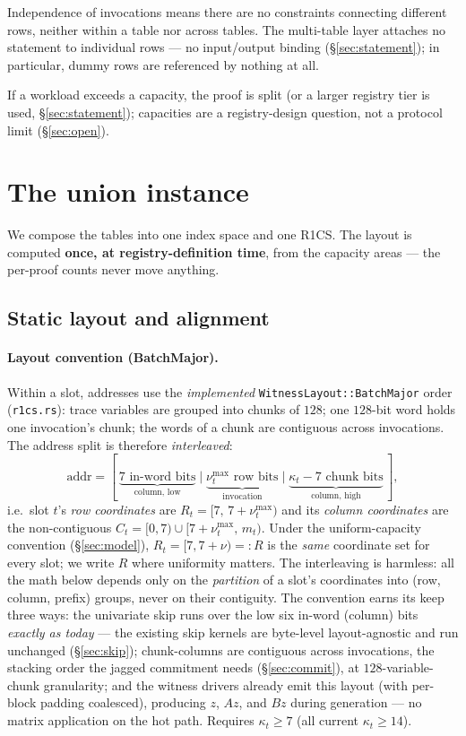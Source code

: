 \documentclass[11pt]{article}
\newcommand{\code}[1]{\texttt{#1}}
\theoremstyle{definition}
\begin{document}
Independence of invocations means there are no constraints connecting
different rows, neither within a table nor across tables. The multi-table
layer attaches no statement to individual rows --- no input/output binding
(\S\ref{sec:statement}); in particular, dummy rows are referenced by
nothing at all.

If a workload exceeds a capacity, the proof is split (or a larger registry
tier is used, \S\ref{sec:statement}); capacities are a registry-design
question, not a protocol limit (\S\ref{sec:open}).

\section{The union instance}\label{sec:union}

We compose the tables into one index space and one R1CS. The layout is
computed \textbf{once, at registry-definition time}, from the capacity
areas --- the per-proof counts never move anything.

\subsection{Static layout and alignment}

\paragraph{Layout convention (BatchMajor).} Within a slot, addresses use
the \emph{implemented} \code{WitnessLayout::BatchMajor} order
(\code{r1cs.rs}): trace variables are grouped into chunks of $128$; one
$128$-bit word holds one invocation's chunk; the words of a chunk are
contiguous across invocations. The address split is therefore
\emph{interleaved}:
\[
  \text{addr} = [\,\underbrace{7 \text{ in-word bits}}_{\text{column,
  low}} \mid \underbrace{\nu_t^{\max} \text{ row bits}}_{\text{invocation}}
  \mid \underbrace{\kappa_t - 7 \text{ chunk bits}}_{\text{column,
  high}}\,],
\]
i.e.\ slot $t$'s \emph{row coordinates} are $R_t = [7,\, 7{+}\nu_t^{\max})$
and its \emph{column coordinates} are the non-contiguous
$C_t = [0,7) \cup [7{+}\nu_t^{\max},\, m_t)$. Under the uniform-capacity
convention (\S\ref{sec:model}), $R_t = [7, 7{+}\nu) =: R$ is the
\emph{same} coordinate set for every slot; we write $R$ where uniformity
matters. The interleaving is
harmless: all the math below depends only on the \emph{partition} of a
slot's coordinates into (row, column, prefix) groups, never on their
contiguity. The convention earns its keep three ways: the univariate skip
runs over the low six in-word (column) bits \emph{exactly as today} ---
the existing skip kernels are byte-level layout-agnostic and run unchanged
(\S\ref{sec:skip}); chunk-columns are contiguous across invocations, the
stacking order the jagged commitment needs (\S\ref{sec:commit}), at
$128$-variable-chunk granularity; and the witness drivers already emit
this layout (with per-block padding coalesced), producing $z$, $Az$, and
$Bz$ during generation --- no matrix application on the hot path. Requires
$\kappa_t \ge 7$ (all current $\kappa_t \ge 14$).
\end{document}
